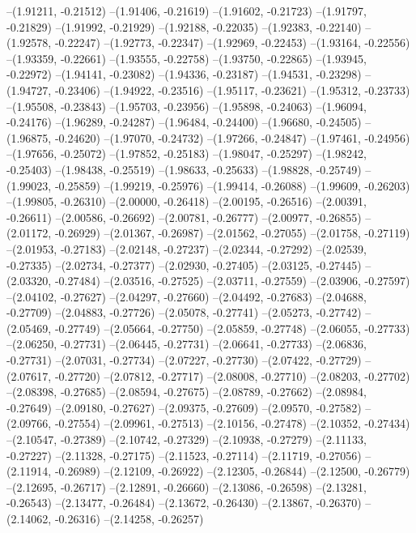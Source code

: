 --(1.91211, -0.21512)
--(1.91406, -0.21619)
--(1.91602, -0.21723)
--(1.91797, -0.21829)
--(1.91992, -0.21929)
--(1.92188, -0.22035)
--(1.92383, -0.22140)
--(1.92578, -0.22247)
--(1.92773, -0.22347)
--(1.92969, -0.22453)
--(1.93164, -0.22556)
--(1.93359, -0.22661)
--(1.93555, -0.22758)
--(1.93750, -0.22865)
--(1.93945, -0.22972)
--(1.94141, -0.23082)
--(1.94336, -0.23187)
--(1.94531, -0.23298)
--(1.94727, -0.23406)
--(1.94922, -0.23516)
--(1.95117, -0.23621)
--(1.95312, -0.23733)
--(1.95508, -0.23843)
--(1.95703, -0.23956)
--(1.95898, -0.24063)
--(1.96094, -0.24176)
--(1.96289, -0.24287)
--(1.96484, -0.24400)
--(1.96680, -0.24505)
--(1.96875, -0.24620)
--(1.97070, -0.24732)
--(1.97266, -0.24847)
--(1.97461, -0.24956)
--(1.97656, -0.25072)
--(1.97852, -0.25183)
--(1.98047, -0.25297)
--(1.98242, -0.25403)
--(1.98438, -0.25519)
--(1.98633, -0.25633)
--(1.98828, -0.25749)
--(1.99023, -0.25859)
--(1.99219, -0.25976)
--(1.99414, -0.26088)
--(1.99609, -0.26203)
--(1.99805, -0.26310)
--(2.00000, -0.26418)
--(2.00195, -0.26516)
--(2.00391, -0.26611)
--(2.00586, -0.26692)
--(2.00781, -0.26777)
--(2.00977, -0.26855)
--(2.01172, -0.26929)
--(2.01367, -0.26987)
--(2.01562, -0.27055)
--(2.01758, -0.27119)
--(2.01953, -0.27183)
--(2.02148, -0.27237)
--(2.02344, -0.27292)
--(2.02539, -0.27335)
--(2.02734, -0.27377)
--(2.02930, -0.27405)
--(2.03125, -0.27445)
--(2.03320, -0.27484)
--(2.03516, -0.27525)
--(2.03711, -0.27559)
--(2.03906, -0.27597)
--(2.04102, -0.27627)
--(2.04297, -0.27660)
--(2.04492, -0.27683)
--(2.04688, -0.27709)
--(2.04883, -0.27726)
--(2.05078, -0.27741)
--(2.05273, -0.27742)
--(2.05469, -0.27749)
--(2.05664, -0.27750)
--(2.05859, -0.27748)
--(2.06055, -0.27733)
--(2.06250, -0.27731)
--(2.06445, -0.27731)
--(2.06641, -0.27733)
--(2.06836, -0.27731)
--(2.07031, -0.27734)
--(2.07227, -0.27730)
--(2.07422, -0.27729)
--(2.07617, -0.27720)
--(2.07812, -0.27717)
--(2.08008, -0.27710)
--(2.08203, -0.27702)
--(2.08398, -0.27685)
--(2.08594, -0.27675)
--(2.08789, -0.27662)
--(2.08984, -0.27649)
--(2.09180, -0.27627)
--(2.09375, -0.27609)
--(2.09570, -0.27582)
--(2.09766, -0.27554)
--(2.09961, -0.27513)
--(2.10156, -0.27478)
--(2.10352, -0.27434)
--(2.10547, -0.27389)
--(2.10742, -0.27329)
--(2.10938, -0.27279)
--(2.11133, -0.27227)
--(2.11328, -0.27175)
--(2.11523, -0.27114)
--(2.11719, -0.27056)
--(2.11914, -0.26989)
--(2.12109, -0.26922)
--(2.12305, -0.26844)
--(2.12500, -0.26779)
--(2.12695, -0.26717)
--(2.12891, -0.26660)
--(2.13086, -0.26598)
--(2.13281, -0.26543)
--(2.13477, -0.26484)
--(2.13672, -0.26430)
--(2.13867, -0.26370)
--(2.14062, -0.26316)
--(2.14258, -0.26257)

